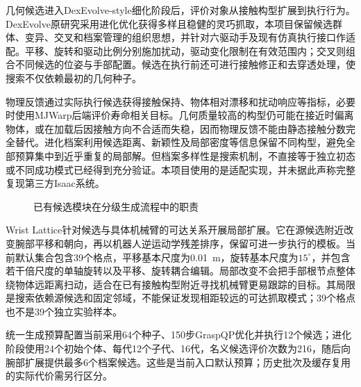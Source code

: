 几何候选进入DexEvolve-style细化阶段后，评价对象从接触构型扩展到执行行为。DexEvolve原研究采用进化优化获得多样且稳健的灵巧抓取\cite{zurbrugg2026dexevolve}，本项目保留候选群体、变异、交叉和档案管理的组织思想，并针对六驱动手及现有仿真执行接口作适配。平移、旋转和驱动比例分别施加扰动，驱动变化限制在有效范围内；交叉则组合不同候选的位姿与手部配置。候选在执行前还可进行接触修正和去穿透处理，使搜索不仅依赖最初的几何种子。

物理反馈通过实际执行候选获得接触保持、物体相对漂移和扰动响应等指标，必要时使用MJWarp后端评价寿命相关目标。几何质量较高的构型仍可能在接近时偏离物体，或在加载后因接触方向不合适而失稳，因而物理反馈不能由静态接触分数完全替代。进化档案利用候选距离、新颖性及局部密度等信息保留不同构型，避免全部预算集中到近乎重复的局部解。但档案多样性是搜索机制，不直接等于独立初态或不同成功模式已经得到充分验证。本项目使用的是适配实现，并未据此声称完整复现第三方Isaac系统。

\begin{figure}[htbp]
 \centering
 \caption{已有候选模块在分级生成流程中的职责}
 \label{fig:ch03_candidate_sources}
\end{figure}

Wrist Lattice针对候选与具体机械臂的可达关系开展局部扩展。它在源候选附近改变腕部平移和朝向，再以机器人逆运动学残差排序，保留可进一步执行的模板。当前默认集合包含39个格点，平移基本尺度为0.01~m，旋转基本尺度为$15^\circ$，并包含若干倍尺度的单轴旋转以及平移、旋转耦合编辑。局部改变不会把手部根节点整体绕物体远距离扫动，适合在已有接触构型附近寻找机械臂更易跟踪的目标。其局限是搜索依赖源候选和固定邻域，不能保证发现相距较远的可达抓取模式；39个格点也不是39个独立实验样本。

统一生成预算配置当前采用64个种子、150步GraspQP优化并执行12个候选；进化阶段使用24个初始个体、每代12个子代、16代，名义候选评价次数为216，随后向腕部扩展提供最多6个档案候选。这些是当前入口默认预算；历史批次及缓存复用的实际代价需另行区分。

